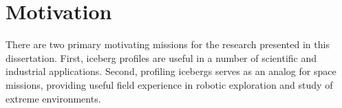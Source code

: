 





\section{Motivation}

There are two primary motivating missions for the research presented in this dissertation. First, iceberg profiles are useful in a number of scientific and industrial applications. Second, profiling icebergs serves as an analog for space missions, providing useful field experience in robotic exploration and study of extreme environments.


